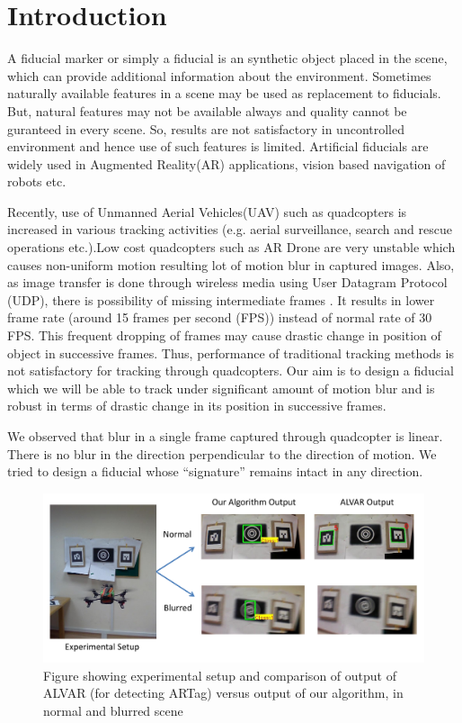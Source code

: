 \documentclass[runningheads]{llncs}
\begin{document}
\section{Introduction}
A fiducial marker or simply a fiducial is an synthetic object placed in the
scene, which can provide additional information about the environment. Sometimes
naturally available features in a scene may be used as replacement to fiducials.
But, natural features may not be available always and quality cannot be
guranteed in every scene. So, results are not satisfactory in uncontrolled
environment and hence use of such features is limited. Artificial fiducials are
widely used in Augmented Reality(AR)\cite{Zhang:2002}\cite{Dorfmuller99}
applications, vision based navigation of robots\cite{Davison:2007} etc.

Recently, use of Unmanned Aerial Vehicles(UAV) such as quadcopters is increased
in various tracking activities (e.g. aerial surveillance, search and rescue
operations etc.).Low cost quadcopters such as AR Drone are very unstable which
causes non-uniform motion resulting lot of motion blur in captured images.
Also, as image transfer is done through wireless media using User Datagram
Protocol (UDP), there is possibility of missing intermediate frames . It
results in lower frame rate (around 15 frames per second (FPS)) instead of
normal rate of 30 FPS. This frequent dropping of frames may cause drastic
change in position of object in successive frames. Thus, performance of
traditional tracking methods is not satisfactory for tracking through
quadcopters. Our aim is to design a fiducial which we will be able to track
under significant amount of motion blur and is robust in terms of drastic
change in its position in successive frames.

We observed that blur in a single frame captured through quadcopter is linear.
There is no blur in the direction perpendicular to the direction of motion. We
tried to design a fiducial whose ``signature'' remains intact in any direction.

\begin{figure}
\includegraphics[width=\linewidth]{teaser.pdf}
\caption{Figure showing experimental setup and comparison of
output of ALVAR\cite{alvar} (for detecting ARTag) versus output of our
algorithm, in normal and blurred scene}
\end{figure}
 
\end{document}
